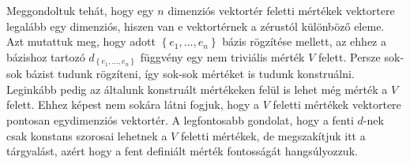 \documentclass[9pt, a4paper, showtrims]{memoir}
\theoremstyle{plain}
\theoremstyle{remark}
\theoremstyle{definition}
\begin{document}
Meggondoltuk tehát, 
hogy egy $n$ dimenziós vektortér feletti mértékek vektortere legalább egy dimenziós,
hiszen van e vektortérnek a zérustól különböző eleme.
Azt mutattuk meg, hogy
adott $\left\{ e_1,\dots,e_n \right\}$ bázis rögzítése mellett, 
az ehhez a bázishoz tartozó $d_{\left\{ e_1,\dots,e_n \right\}}$ függvény egy nem triviális mérték $V$ felett.
Persze sok-sok bázist tudunk rögzíteni, így sok-sok mértéket is tudunk konstruálni.
Leginkább pedig az általunk konstruált mértékeken felül is lehet még mérték a $V$ felett.
Ehhez képest nem sokára látni fogjuk, 
hogy a $V$ feletti mértékek vektortere pontosan egydimenziós vektortér.
A legfontosabb gondolat, hogy a fenti $d$-nek csak konstans szorosai lehetnek a $V$ feletti mértékek,
de megszakítjuk itt a tárgyalást, azért hogy a fent definiált mérték fontosságát hangsúlyozzuk.
\end{document}
